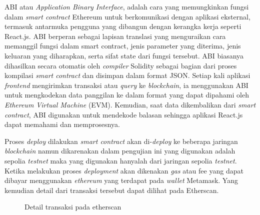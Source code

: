   ABI atau \emph{Application Binary Interface}, adalah cara yang memungkinkan fungsi dalam \emph{smart contract} Ethereum untuk berkomunikasi dengan aplikasi eksternal, termasuk antarmuka pengguna yang dibangun dengan kerangka kerja seperti React.js. ABI berperan sebagai lapisan translasi yang menguraikan cara memanggil fungsi dalam smart contract, jenis parameter yang diterima, jenis keluaran yang diharapkan, serta sifat state dari fungsi tersebut. ABI biasanya dihasilkan secara otomatis oleh \emph{compiler} Solidity sebagai bagian dari proses kompilasi \emph{smart contract} dan disimpan dalam format JSON. Setiap kali aplikasi \emph{frontend} mengirimkan transaksi atau \emph{query} ke \emph{blockchain}, ia menggunakan ABI untuk mengkodekan data panggilan ke dalam format yang dapat dipahami oleh \emph{Ethereum Virtual Machine} (EVM). Kemudian, saat data dikembalikan dari \emph{smart contract}, ABI digunakan untuk mendekode balasan sehingga aplikasi React.js dapat memahami dan memprosesnya.
  
  Proses \emph{deploy} dilakukan \emph{smart contract} akan di-\emph{deploy} ke beberapa jaringan \emph{blockchain} namun dikarenakan dalam pengujian ini yang digunakan adalah sepolia \emph{testnet} maka yang digunakan hanyalah dari jaringan sepolia \emph{testnet}. Ketika melakukan proses \emph{deployment} akan dikenakan \emph{gas} atau fee yang dapat dibayar menggunakan \emph{ethereum} yang terdapat pada \emph{wallet} Metamask. Yang kemudian detail dari transaksi tersebut dapat dilihat pada Etherscan.
  
  \begin{figure} [H] \centering
    \caption{Detail transaksi pada etherscan}
    \label{fig:transaction}
  \end{figure}
  

